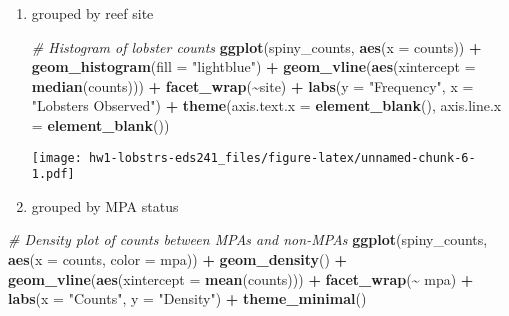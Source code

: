 \documentclass[
]{article}
\newenvironment{Shaded}{\begin{snugshade}}{\end{snugshade}}
\newcommand{\AttributeTok}[1]{\textcolor[rgb]{0.13,0.29,0.53}{#1}}
\newcommand{\CommentTok}[1]{\textcolor[rgb]{0.56,0.35,0.01}{\textit{#1}}}
\newcommand{\FunctionTok}[1]{\textcolor[rgb]{0.13,0.29,0.53}{\textbf{#1}}}
\newcommand{\NormalTok}[1]{#1}
\newcommand{\SpecialCharTok}[1]{\textcolor[rgb]{0.81,0.36,0.00}{\textbf{#1}}}
\newcommand{\StringTok}[1]{\textcolor[rgb]{0.31,0.60,0.02}{#1}}
\begin{document}
\begin{enumerate}
\def\labelenumi{\arabic{enumi})}
\item
  grouped by reef site

\begin{Shaded}
\begin{Highlighting}[]
\CommentTok{\# Histogram of lobster counts }
\FunctionTok{ggplot}\NormalTok{(spiny\_counts, }\FunctionTok{aes}\NormalTok{(}\AttributeTok{x =}\NormalTok{ counts)) }\SpecialCharTok{+}
    \FunctionTok{geom\_histogram}\NormalTok{(}\AttributeTok{fill =} \StringTok{"lightblue"}\NormalTok{) }\SpecialCharTok{+}
    \FunctionTok{geom\_vline}\NormalTok{(}\FunctionTok{aes}\NormalTok{(}\AttributeTok{xintercept =} \FunctionTok{median}\NormalTok{(counts))) }\SpecialCharTok{+}
    \FunctionTok{facet\_wrap}\NormalTok{(}\SpecialCharTok{\textasciitilde{}}\NormalTok{site) }\SpecialCharTok{+}
    \FunctionTok{labs}\NormalTok{(}\AttributeTok{y =} \StringTok{"Frequency"}\NormalTok{, }\AttributeTok{x =} \StringTok{"Lobsters Observed"}\NormalTok{) }\SpecialCharTok{+}
    \FunctionTok{theme}\NormalTok{(}\AttributeTok{axis.text.x =} \FunctionTok{element\_blank}\NormalTok{(),}
          \AttributeTok{axis.line.x =} \FunctionTok{element\_blank}\NormalTok{())}
\end{Highlighting}
\end{Shaded}

  \texttt{[image: hw1-lobstrs-eds241\_files/figure-latex/unnamed-chunk-6-1.pdf]}

  \hfill\break
\item
  grouped by MPA status
\end{enumerate}

\begin{Shaded}
\begin{Highlighting}[]
\CommentTok{\# Density plot of counts between MPAs and non{-}MPAs}
\FunctionTok{ggplot}\NormalTok{(spiny\_counts, }\FunctionTok{aes}\NormalTok{(}\AttributeTok{x =}\NormalTok{ counts, }
                         \AttributeTok{color =}\NormalTok{ mpa)) }\SpecialCharTok{+}
    \FunctionTok{geom\_density}\NormalTok{() }\SpecialCharTok{+}
    \FunctionTok{geom\_vline}\NormalTok{(}\FunctionTok{aes}\NormalTok{(}\AttributeTok{xintercept =} \FunctionTok{mean}\NormalTok{(counts))) }\SpecialCharTok{+}
    \FunctionTok{facet\_wrap}\NormalTok{(}\SpecialCharTok{\textasciitilde{}}\NormalTok{ mpa) }\SpecialCharTok{+}
    \FunctionTok{labs}\NormalTok{(}\AttributeTok{x =} \StringTok{"Counts"}\NormalTok{, }\AttributeTok{y =} \StringTok{"Density"}\NormalTok{) }\SpecialCharTok{+}
    \FunctionTok{theme\_minimal}\NormalTok{()}
\end{Highlighting}
\end{Shaded}
\end{document}
